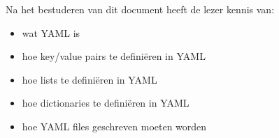Na het bestuderen van dit document heeft de lezer kennis van:
\begin{itemize}
\item wat YAML is
\item hoe key/value pairs te defini\"eren in YAML
\item hoe lists te defini\"eren in YAML
\item hoe dictionaries te defini\"eren in YAML
\item hoe YAML files geschreven moeten worden
\end{itemize}

